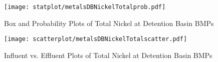         \begin{figure}[hb]   %
            \centering
            \texttt{[image: statplot/metalsDBNickelTotalprob.pdf]}
            \caption{Box and Probability Plots of Total Nickel at Detention Basin BMPs}
        \end{figure}         %
        
        
        \begin{figure}[hb]   %
            \centering
            \texttt{[image: scatterplot/metalsDBNickelTotalscatter.pdf]}
            \caption{Influent vs. Effluent Plots of Total Nickel at Detention Basin BMPs}
        \end{figure}         %
        \clearpage
        